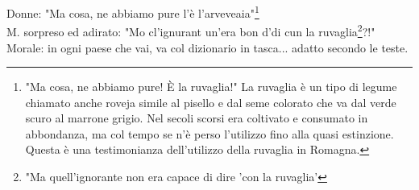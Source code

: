 Donne: "Ma cosa, ne abbiamo pure l'è l'arveveaia"\footnote{"Ma cosa, ne abbiamo pure! È la ruvaglia!" La ruvaglia è un tipo di legume chiamato anche roveja simile al pisello e dal seme colorato che va dal verde scuro al marrone grigio. Nel secoli scorsi era coltivato e consumato in abbondanza, ma col tempo se n'è perso l'utilizzo fino alla quasi estinzione. Questa è una testimonianza dell'utilizzo della ruvaglia in Romagna.}\\
M. \:\: sorpreso ed adirato: "Mo cl'ignurant un'era bon d'di cun la ruvaglia\footnote{"Ma quell'ignorante non era capace di dire 'con la ruvaglia'}?!"\\
Morale: in ogni paese che vai, va col dizionario in tasca... adatto secondo le teste.

